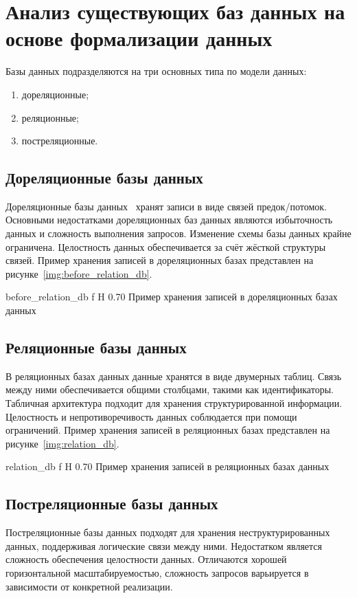 \section{Анализ существующих баз данных на основе формализации данных}

Базы данных подразделяются на три основных типа по модели данных:

\begin{enumerate}
    \item дореляционные;
    \item реляционные;
    \item постреляционные.
\end{enumerate}

\subsection{Дореляционные базы данных}
Дореляционные базы данных~\cite{DBTypes} хранят записи в виде связей предок/потомок. 
Основными недостатками дореляционных баз данных являются избыточность данных и 
сложность выполнения запросов. Изменение схемы базы данных крайне ограничена. 
Целостность данных обеспечивается за счёт жёсткой структуры связей. Пример хранения записей
в дореляционных базах представлен на рисунке~\ref{img:before_relation_db}.

    {before_relation_db}
    {f}
    {H}
    {0.70\textwidth}
    {Пример хранения записей в дореляционных базах данных}

\subsection{Реляционные базы данных}
В реляционных базах данных данные хранятся в виде двумерных таблиц.
Связь между ними обеспечивается общими столбцами, такими как идентификаторы. 
Табличная архитектура подходит для хранения структурированной информации.
Целостность и непротиворечивость данных соблюдается при помощи ограничений. Пример хранения записей
в реляционных базах представлен на рисунке~\ref{img:relation_db}.

    {relation_db}
    {f}
    {H}
    {0.70\textwidth}
    {Пример хранения записей в реляционных базах данных}

\subsection{Постреляционные базы данных}
Постреляционные базы данных подходят для хранения неструктурированных
данных, поддерживая логические связи между ними. Недостатком является сложность 
обеспечения целостности данных. Отличаются хорошей горизонтальной
масштабируемостью, сложность запросов варьируется в зависимости от конкретной реализации.

